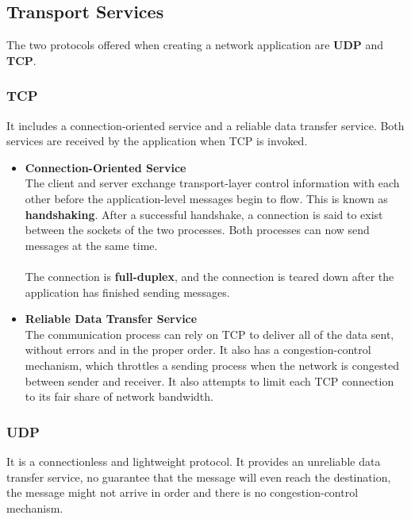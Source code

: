 \documentclass{article}
\begin{document}
\subsection{Transport Services}
The two protocols offered when creating a network application are \textbf{UDP} and \textbf{TCP}.

\subsubsection{TCP}
It includes a connection-oriented service and a reliable data transfer service. Both services are received by the application when TCP is invoked.

\begin{itemize}
	\item \textbf{Connection-Oriented Service}
	\vspace{.2cm} \\
	The client and server exchange transport-layer control information with each other before the application-level messages begin to flow. This is known as \textbf{handshaking}. After a successful handshake, a connection is said to exist between the sockets of the two processes. Both processes can now send messages at the same time. \\ \\
	The connection is \textbf{full-duplex}, and the connection is teared down after the application has finished sending messages.
	
	\item \textbf{Reliable Data Transfer Service}
	\vspace{.2cm} \\
	The communication process can rely on TCP to deliver all of the data sent, without errors and in the proper order. It also has a congestion-control mechanism, which throttles a sending process when the network is congested between sender and receiver. It also attempts to limit each TCP connection to its fair share of network bandwidth.
\end{itemize}


\subsubsection{UDP}
It is a connectionless and lightweight protocol. It provides an unreliable data transfer service, no guarantee that the message will even reach the destination, the message might not arrive in order and there is no congestion-control mechanism.
\end{document}
